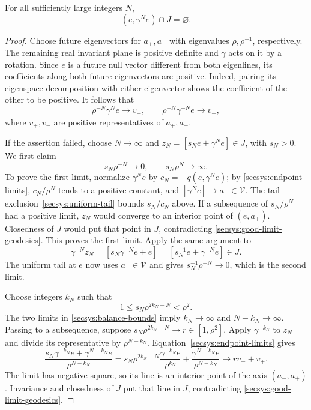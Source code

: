 \begin{lemma}\label{secsys:whole-geodesic}
For all sufficiently large integers $N$,
\[
                         (e,\gamma^N e)\cap J=\varnothing.
\]
\end{lemma}

\begin{proof}
Choose future eigenvectors for $a_+,a_-$ with eigenvalues
$\rho,\rho^{-1}$, respectively.  The remaining real invariant
plane is positive definite and $\gamma$ acts on it by a rotation.
Since $e$ is a future null vector different from both eigenlines,
its coefficients along both future eigenvectors are positive.
Indeed, pairing its eigenspace decomposition with either eigenvector
shows the coefficient of the other to be positive.  It follows that
\begin{equation}\label{secsys:endpoint-limits}
 \rho^{-N}\gamma^Ne\longrightarrow v_+,
 \qquad
 \rho^{-N}\gamma^{-N}e\longrightarrow v_-,
\end{equation}
where $v_+,v_-$ are positive representatives of $a_+,a_-$.

If the assertion failed, choose $N\to\infty$ and
$z_N=[s_Ne+\gamma^Ne]\in J$, with $s_N>0$.  We first claim
\begin{equation}\label{secsys:balance-bounds}
             s_N\rho^{-N}\longrightarrow0,
             \qquad s_N\rho^N\longrightarrow\infty.
\end{equation}
To prove the first limit, normalize $\gamma^Ne$ by
$c_N=-q(e,\gamma^Ne)$; by \eqref{secsys:endpoint-limits},
$c_N/\rho^N$ tends to a positive constant, and
$[\gamma^Ne]\to a_+\in\mathcal V$.
The tail exclusion~\eqref{secsys:uniform-tail} bounds $s_N/c_N$
above.  If a subsequence of $s_N/\rho^N$ had a positive limit,
$z_N$ would converge to an interior point of $(e,a_+)$.
Closedness of $J$ would put that point in $J$, contradicting
\eqref{secsys:good-limit-geodesics}.  This proves the first limit.
Apply the same argument to
\[
 \gamma^{-N}z_N
       =[s_N\gamma^{-N}e+e]
       =[s_N^{-1}e+\gamma^{-N}e]\in J.
\]
The uniform tail at $e$ now uses $a_-\in\mathcal V$ and gives
$s_N^{-1}\rho^{-N}\to0$, which is the second limit.

Choose integers $k_N$ such that
\[
               1\le s_N\rho^{2k_N-N}<\rho^2.
\]
The two limits in \eqref{secsys:balance-bounds} imply
$k_N\to\infty$ and $N-k_N\to\infty$.
Passing to a subsequence, suppose
$s_N\rho^{2k_N-N}\to r\in[1,\rho^2]$.
Apply $\gamma^{-k_N}$ to $z_N$ and divide its representative by
$\rho^{N-k_N}$.  Equation~\eqref{secsys:endpoint-limits} gives
\[
 \frac{s_N\gamma^{-k_N}e+\gamma^{N-k_N}e}{\rho^{N-k_N}}
   =s_N\rho^{2k_N-N}
       \frac{\gamma^{-k_N}e}{\rho^{k_N}}
       +\frac{\gamma^{N-k_N}e}{\rho^{N-k_N}}
   \longrightarrow r v_-+v_+.
\]
The limit has negative square, so its line is an interior point of
the axis $(a_-,a_+)$.  Invariance and closedness of $J$ put that
line in $J$, contradicting \eqref{secsys:good-limit-geodesics}.
\end{proof}

